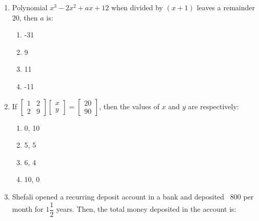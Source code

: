 \begin{enumerate}[label=(\roman*)]
    \item Polynomial $x^3 - 2x^2 + ax + 12$ when divided by $(x+1)$ leaves a remainder
        20, then $a$ is:

        \begin{multicols}{2}
        \begin{enumerate}[label=(\alph*)]
            \item -31
            \item 9
            \item 11
            \item -11
        \end{enumerate}
        \end{multicols}

    \item If $\begin{bmatrix*} 1 & 2 \\ 2 & 9 \end{bmatrix*}
              \begin{bmatrix*} x \\ y \end{bmatrix*} = 
              \begin{bmatrix*} 20 \\ 90 \end{bmatrix*}$, then the values of 
              $x$ and $y$ are respectively:

        \begin{multicols}{2}
        \begin{enumerate}[label=(\alph*)]
            \item 0, 10 
            \item 5, 5
            \item 6, 4
            \item 10, 0
        \end{enumerate}
        \end{multicols}

    \item Shefali opened a recurring deposit account in a bank and deposited 
        \rupee~800 per month for $1\dfrac12$ years. Then, the total money 
        deposited in the account is:


\end{enumerate}
